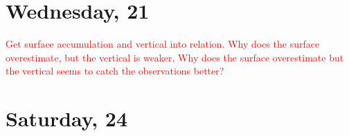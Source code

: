
%







\section{Wednesday, \SI{21}{\dec}}
\textcolor{red}{Get surface accumulation and vertical into relation. Why does the surface overestimate, but the vertical is weaker. Why does the surface overestimate but the vertical seems to catch the observations better?}
\section{Saturday, \SI{24}{\dec}}
